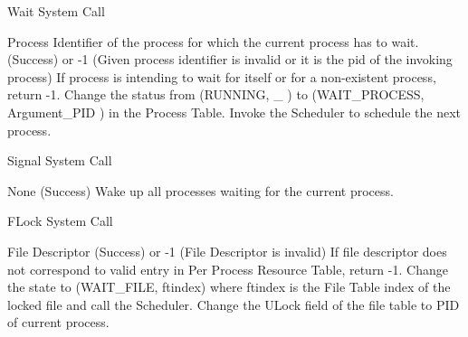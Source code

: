 
\begin{algorithm}
\caption{Wait System Call}
\begin{algorithmic}
\REQUIRE Process Identifier of the process for which the current process has to wait.
 (Success) or -1 (Given process identifier is invalid or it is the pid of the invoking process)
\STATE If process is intending to wait for itself or for a non-existent process, return -1.    
\STATE Change the status from (RUNNING, \_ ) to (WAIT\_PROCESS, Argument\_PID ) in the Process Table.
\STATE Invoke the Scheduler to schedule the next process.
\end{algorithmic}
\end{algorithm}


\begin{algorithm}
\caption{Signal System Call}
\begin{algorithmic}
\REQUIRE None
 (Success) 
\STATE Wake up all processes waiting for the current process.
\end{algorithmic}
\end{algorithm}


\begin{algorithm}
\caption{FLock System Call}
\begin{algorithmic}
\REQUIRE File Descriptor
 (Success) or -1 (File Descriptor is invalid)
\STATE If file descriptor does not correspond to valid entry in Per Process Resource Table, return -1.
    \STATE Change the state to (WAIT\_FILE, ftindex) where ftindex is the File Table index of the locked file and call the Scheduler.
\ENDWHILE
\STATE Change the ULock field of the file table to PID of current process.     
\end{algorithmic}
\end{algorithm}

